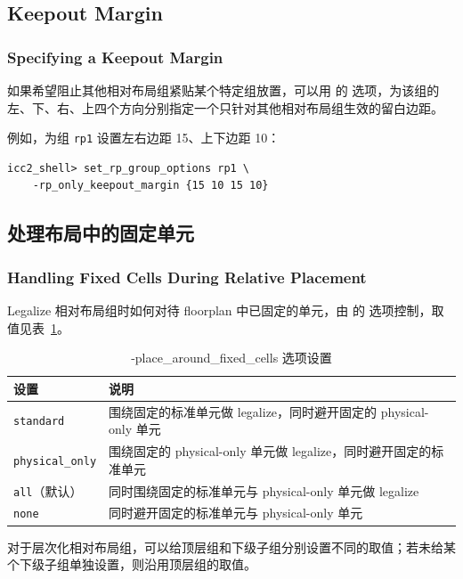 \subsection{Keepout Margin}
\subsubsection*{Specifying a Keepout Margin}

如果希望阻止其他相对布局组紧贴某个特定组放置，可以用  的  选项，为该组的左、下、右、上四个方向分别指定一个只针对其他相对布局组生效的留白边距。

例如，为组 \texttt{rp1} 设置左右边距 15、上下边距 10：
\begin{lstlisting}
icc2_shell> set_rp_group_options rp1 \
    -rp_only_keepout_margin {15 10 15 10}
\end{lstlisting}

\subsection{处理布局中的固定单元}
\subsubsection*{Handling Fixed Cells During Relative Placement}

Legalize 相对布局组时如何对待 floorplan 中已固定的单元，由  的  选项控制，取值见表~\ref{tab:rp-fixed}。

\begin{table}[htbp]
\centering
\caption{-place\_around\_fixed\_cells 选项设置}
\label{tab:rp-fixed}
\begin{tabularx}{\textwidth}{lX}
\toprule
设置 & 说明 \\
\midrule
\texttt{standard} & 围绕固定的标准单元做 legalize，同时避开固定的 physical-only 单元 \\
\texttt{physical\_only} & 围绕固定的 physical-only 单元做 legalize，同时避开固定的标准单元 \\
\texttt{all}（默认） & 同时围绕固定的标准单元与 physical-only 单元做 legalize \\
\texttt{none} & 同时避开固定的标准单元与 physical-only 单元 \\
\bottomrule
\end{tabularx}
\end{table}

对于层次化相对布局组，可以给顶层组和下级子组分别设置不同的取值；若未给某个下级子组单独设置，则沿用顶层组的取值。

